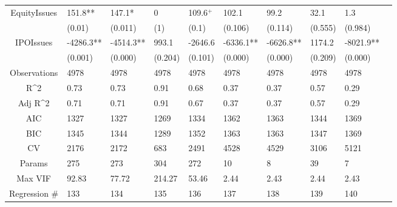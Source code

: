 \documentclass{article}
\begin{document}
\begin{table}[H]
\begin{tabular}{|clllllllll|}
  EquityIssues & 151.8** & 147.1* & 0 & 109.6$^{+}$ & 102.1 & 99.2 & 32.1 & 1.3 & \\ 
   & (0.01) & (0.011) & (1) & (0.1) & (0.106) & (0.114) & (0.555) & (0.984) & \\ 
  IPOIssues & -4286.3** & -4514.3** & 993.1 & -2646.6 & -6336.1** & -6626.8** & 1174.2 & -8021.9** & \\ 
   & (0.001) & (0.000) & (0.204) & (0.101) & (0.000) & (0.000) & (0.209) & (0.000) & \\ 
  \hline 
 Observations & 4978 & 4978 & 4978 & 4978 & 4978 & 4978 & 4978 & 4978 & \\ 
  R^2 & 0.73 & 0.73 & 0.91 & 0.68 & 0.37 & 0.37 & 0.57 & 0.29 & \\ 
  Adj R^2 & 0.71 & 0.71 & 0.91 & 0.67 & 0.37 & 0.37 & 0.57 & 0.29 & \\ 
  AIC & 1327 & 1327 & 1269 & 1334 & 1362 & 1363 & 1344 & 1369 & \\ 
  BIC & 1345 & 1344 & 1289 & 1352 & 1363 & 1363 & 1347 & 1369 & \\ 
  CV & 2176 & 2172 & 683 & 2491 & 4528 & 4529 & 3106 & 5121 & \\ 
  Params & 275 & 273 & 304 & 272 & 10 & 8 & 39 & 7 & \\ 
  Max VIF & 92.83 & 77.72 & 214.27 & 53.46 & 2.44 & 2.43 & 2.44 & 2.43 & \\ 
  Regression \# & 133 & 134 & 135 & 136 & 137 & 138 & 139 & 140 & \\ 
   \hline
\end{tabular}
 
\end{table}
\end{document}
